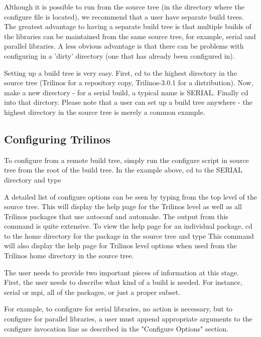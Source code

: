 \documentclass[12pt,relax]{TrilinosDevGuide}
\begin{document}
Although it is possible to run  from the source tree (in 
the directory where the configure file is located), we recommend that a 
user have separate build trees.  The greatest advantage to having a separate 
build tree is that multiple builds of the libraries can be maintained
from the same source tree, for 
example, serial and parallel libraries.  A less obvious advantage is that 
there can be problems with configuring in a 'dirty' directory (one that has 
already been configured in).

	Setting up a build tree is very easy.  First, cd to the highest 
directory in the source tree (Trilinos for a repository copy, Trilinos-3.0.1 
for a distribution).  Now, make a new directory - for a serial build, a 
typical name is SERIAL.  Finally cd into that dirctory.  Please note that a 
user can set up a build tree anywhere - the highest directory in the source 
tree is merely a common example.

\subsection{Configuring Trilinos}

	To configure from a remote build tree, simply run the configure script 
in source tree from the root of the build tree.  In the example above, cd to 
the SERIAL directory and type 

A detailed list of configure options can be seen by typing
 from the top level of the 
source tree.  This will display the help page for the Trilinos level as well as all 
Trilinos packages that use autoconf and automake.  The output from this command
is quite extensive.  To view the help page for an individual package, cd to 
the home directory for the package in the source tree and type 
This command will also display the help page for Trilinos level 
options when used from the Trilinos home directory in the source tree.


	The user needs to provide two important pieces of information at this 
stage.  First, the user needs to describe what kind of a build is needed.  For 
instance, serial or mpi, all of the packages, or just a proper subset.  

	For example, to configure for serial libraries, no action is necessary,
but to configure for parallel libraries, a user must append appropriate 
arguments to the configure invocation line as described in the "Configure 
Options" section.
\end{document}
